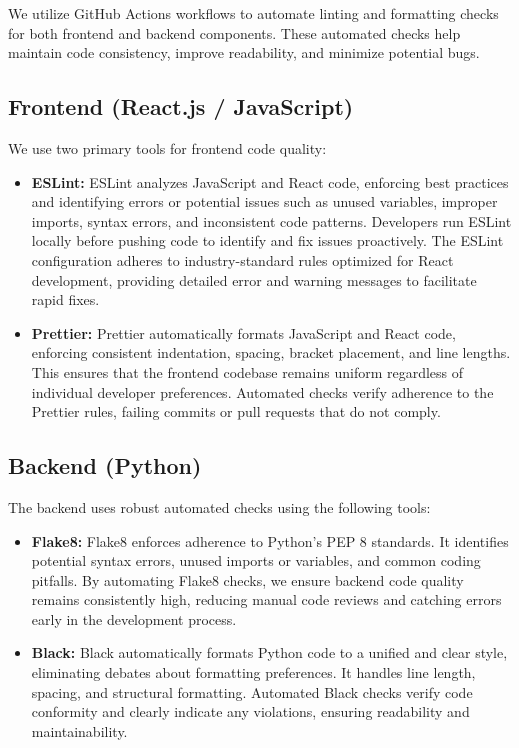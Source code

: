 \documentclass[12pt, titlepage]{article}
\begin{document}
We utilize GitHub Actions workflows to automate linting and formatting checks for both frontend and backend components. These automated checks help maintain code consistency, improve readability, and minimize potential bugs.

\subsection{Frontend (React.js / JavaScript)}

We use two primary tools for frontend code quality:
\begin{itemize}
\item \textbf{ESLint:} ESLint analyzes JavaScript and React code, enforcing best practices and identifying errors or potential issues such as unused variables, improper imports, syntax errors, and inconsistent code patterns. Developers run ESLint locally before pushing code to identify and fix issues proactively. The ESLint configuration adheres to industry-standard rules optimized for React development, providing detailed error and warning messages to facilitate rapid fixes.
\item \textbf{Prettier:} Prettier automatically formats JavaScript and React code, enforcing consistent indentation, spacing, bracket placement, and line lengths. This ensures that the frontend codebase remains uniform regardless of individual developer preferences. Automated checks verify adherence to the Prettier rules, failing commits or pull requests that do not comply.
\end{itemize}

\subsection{Backend (Python)}

The backend uses robust automated checks using the following tools:
\begin{itemize}
\item \textbf{Flake8:} Flake8 enforces adherence to Python's PEP 8 standards. It identifies potential syntax errors, unused imports or variables, and common coding pitfalls. By automating Flake8 checks, we ensure backend code quality remains consistently high, reducing manual code reviews and catching errors early in the development process.
\item \textbf{Black:} Black automatically formats Python code to a unified and clear style, eliminating debates about formatting preferences. It handles line length, spacing, and structural formatting. Automated Black checks verify code conformity and clearly indicate any violations, ensuring readability and maintainability.
\end{itemize}
\end{document}
